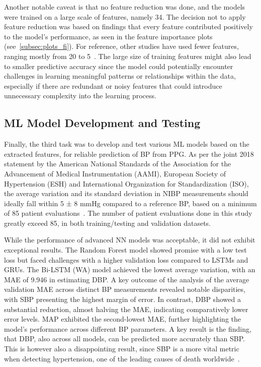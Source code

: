 Another notable caveat is that no feature reduction was done, and the models were trained on a large scale of features, namely 34.
The decision not to apply feature reduction was based on findings that every feature contributed positively to the model's performance, as seen in the feature importance plots (see~\ref{subsec:plots_fi}).
For reference, other studies have used fewer features, ranging mostly from 20 to 5~\cite{el-hajjDeepLearningModels2021, yilmazNocturnalBloodPressure2023, charltonAssessingHemodynamicsPhotoplethysmogram2022}.
The large size of training features might also lead to smaller predictive accuracy since the model could potentially encounter challenges in learning meaningful patterns or relationships within the data,
especially if there are redundant or noisy features that could introduce unnecessary complexity into the learning process.

\subsection{ML Model Development and Testing}
\label{subsec:ml-model-development-and-testing}

Finally, the third task was to develop and test various ML models based on the extracted features, for reliable prediction of BP from PPG\@.
As per the joint 2018 statement by the American National Standards of the Association for the Advancement of Medical Instrumentation (AAMI), European Society of Hypertension (ESH)
and International Organization for Standardization (ISO), the average variation and its standard deviation in NIBP measurements should ideally fall within 5 ± 8 mmHg compared to a reference BP,
based on a minimum of 85 patient evaluations~\cite{stergiouUniversalStandardValidation2018}.
The number of patient evaluations done in this study greatly exceed 85, in both training/testing and validation datasets.

While the performance of advanced NN models was acceptable, it did not exhibit exceptional results.
The Random Forest model showed promise with a low test loss but faced challenges with a higher validation loss compared to LSTMs and GRUs.
The Bi-LSTM (WA) model achieved the lowest average variation, with an MAE of 9.946 in estimating DBP\@.
A key outcome of the analysis of the average validation MAE across distinct BP measurements revealed notable disparities, with SBP presenting the highest margin of error.
In contrast, DBP showed a substantial reduction, almost halving the MAE, indicating comparatively lower error levels.
MAP exhibited the second-lowest MAE, further highlighting the model's performance across different BP parameters.
A key result is the finding, that DBP, also across all models, can be predicted more accurately than SBP.
This is however also a disappointing result, since SBP is a more vital metric when detecting hypertension, one of the leading causes of death worldwide~\cite{WorldHealthStatistics2023}.

